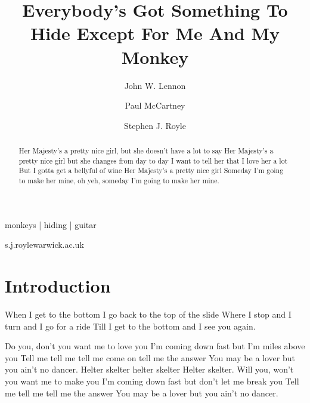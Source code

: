 
\title{Everybody's Got Something To Hide Except For Me And My Monkey}

\author[1,2]{John W. Lennon}
\author[1,3]{Paul McCartney}
\author[1,4,\Letter]{Stephen J. Royle}
\date{}

\maketitle

\begin{abstract}
Her Majesty's a pretty nice girl,
but she doesn't have a lot to say
Her Majesty's a pretty nice girl
but she changes from day to day
I want to tell her that I love her a lot
But I gotta get a bellyful of wine
Her Majesty’s a pretty nice girl
Someday I'm going to make her mine, oh yeh,
someday I'm going to make her mine.
\end{abstract}

\begin{keywords}
monkeys | hiding | guitar
\end{keywords}

\begin{corrauthor}
s.j.royle\at warwick.ac.uk
\end{corrauthor}

\section*{Introduction}\label{s:introduction}

When I get to the bottom I go back to the top of the slide
Where I stop and I turn and I go for a ride
Till I get to the bottom and I see you again.

Do you, don't you want me to love you
I'm coming down fast but I’m miles above you
Tell me tell me tell me come on tell me the answer
You may be a lover but you ain't no dancer.
Helter skelter helter skelter
Helter skelter.
Will you, won't you want me to make you
I'm coming down fast but don't let me break you
Tell me tell me tell me the answer
You may be a lover but you ain't no dancer.


